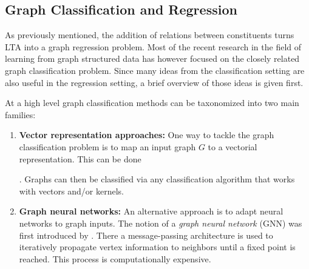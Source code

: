 \documentclass[12pt]{scrartcl}
\begin{document}
\subsection{Graph Classification and Regression}%
\label{sec:related-work:gcr}

As previously mentioned, the addition of relations between constituents turns LTA into a graph regression problem.
Most of the recent research in the field of learning from graph structured data has however focused on the closely related graph classification problem.
Since many ideas from the classification setting are also useful in the regression setting, a brief overview of those ideas is given first.

At a high level graph classification methods can be taxonomized into two main families:
\begin{enumerate}[label=\textbf{\arabic*.}]
	\item \textbf{Vector representation approaches:}
		One way to tackle the graph classification problem is to map an input graph $G$ to a vectorial representation.
		This can be done
		.
		Graphs can then be classified via any classification algorithm that works with vectors and/or kernels.
	\item \textbf{Graph neural networks:}
		An alternative approach is to adapt neural networks to graph inputs.
		The notion of a \textit{graph neural network} (GNN) was first introduced by \citet{Gori2005}.\@
		There a message-passing architecture is used to iteratively propagate vertex information to neighbors until a fixed point is reached.
		This process is computationally expensive.


\end{enumerate}
\end{document}

